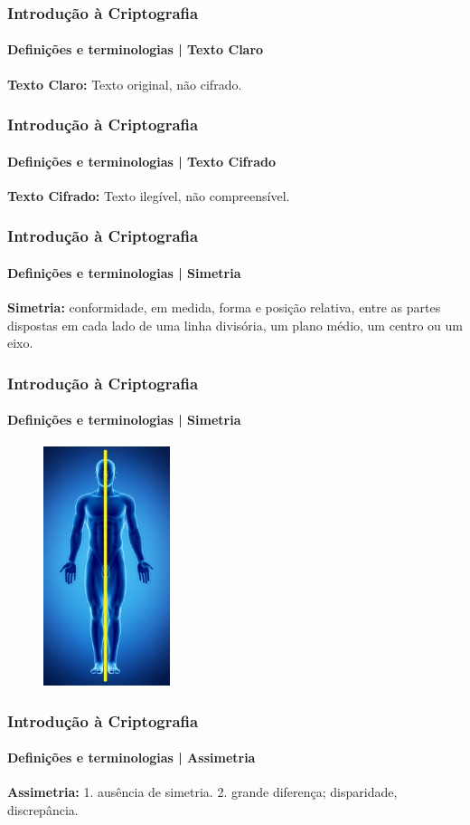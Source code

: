 \documentclass[compress]{beamer}
\begin{document}
\begin{frame}
\frametitle{Introdução à Criptografia}
\framesubtitle{Definições e terminologias | Texto Claro}
\justifying
\textbf{Texto Claro:} Texto original, não cifrado.
\end{frame}

\begin{frame}
\frametitle{Introdução à Criptografia}
\framesubtitle{Definições e terminologias | Texto Cifrado}
\justifying
\textbf{Texto Cifrado:} Texto ilegível, não compreensível.
\end{frame}

\begin{frame}
\frametitle{Introdução à Criptografia}
\framesubtitle{Definições e terminologias | Simetria}
\justifying
	\textbf{Simetria:} conformidade, em medida, forma e posição relativa, entre as partes dispostas em cada lado de uma linha divisória, um plano médio, um centro ou um eixo.
\end{frame}

\begin{frame}
\frametitle{Introdução à Criptografia}
\framesubtitle{Definições e terminologias | Simetria}
\begin{figure}[h]
	\includegraphics[height=7cm]{pics/simetria-bilateral}
\end{figure}
\end{frame}

\begin{frame}
\frametitle{Introdução à Criptografia}
\framesubtitle{Definições e terminologias | Assimetria}
\justifying
	\textbf{Assimetria:} 1. ausência de simetria. 2. grande diferença; disparidade, discrepância. 
\end{frame}
\end{document}
